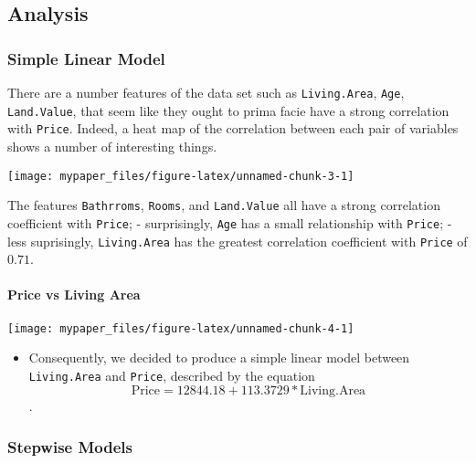 \documentclass[letterpaper,9pt,twocolumn,twoside,]{pinp}
\providecommand{\tightlist}{%
  \setlength{\itemsep}{0pt}\setlength{\parskip}{0pt}}
\begin{document}
\hypertarget{analysis}{%
\subsection{Analysis}\label{analysis}}

\hypertarget{simple-linear-model}{%
\subsubsection{Simple Linear Model}\label{simple-linear-model}}

There are a number features of the data set such as
\texttt{Living.Area}, \texttt{Age}, \texttt{Land.Value}, that seem like
they ought to prima facie have a strong correlation with \texttt{Price}.
Indeed, a heat map of the correlation between each pair of variables
shows a number of interesting things.

\begin{center}\texttt{[image: mypaper\_files/figure-latex/unnamed-chunk-3-1]} \end{center}

The features \texttt{Bathrroms}, \texttt{Rooms}, and \texttt{Land.Value}
all have a strong correlation coefficient with \texttt{Price}; -
surprisingly, \texttt{Age} has a small relationship with \texttt{Price};
- less suprisingly, \texttt{Living.Area} has the greatest correlation
coefficient with \texttt{Price} of \(0.71\).

\hypertarget{price-vs-living-area}{%
\paragraph{Price vs Living Area}\label{price-vs-living-area}}

\begin{center}\texttt{[image: mypaper\_files/figure-latex/unnamed-chunk-4-1]} \end{center}

\begin{itemize}
\tightlist
\item
  Consequently, we decided to produce a simple linear model between
  \texttt{Living.Area} and \texttt{Price}, described by the equation
  \[\text{Price} = 12844.18 + 113.3729 * \text{Living.Area}\].\\
  \vspace{-8mm}
\end{itemize}

\hypertarget{stepwise-models}{%
\subsubsection{Stepwise Models}\label{stepwise-models}}
\end{document}
